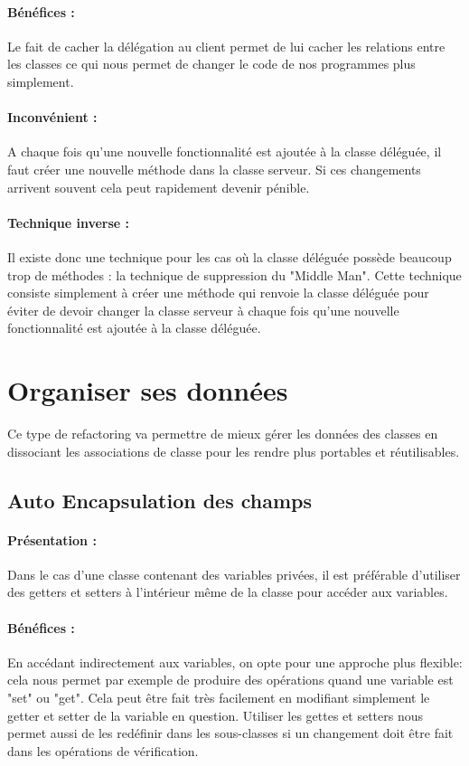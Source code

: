 \documentclass[a4paper,twoside,12pt,openright]{report}
\begin{document}
\paragraph{Bénéfices :}
Le fait de cacher la délégation au client permet de lui cacher les relations entre les classes ce qui nous permet de changer le code de nos programmes plus simplement.

\paragraph{Inconvénient :}
A chaque fois qu'une nouvelle fonctionnalité est ajoutée à la classe déléguée, il faut créer une nouvelle méthode dans la classe serveur. Si ces changements arrivent souvent cela peut rapidement devenir pénible.

\paragraph{Technique inverse :}
Il existe donc une technique pour les cas où la classe déléguée possède beaucoup trop de méthodes : la technique de suppression du "Middle Man".
Cette technique consiste simplement à créer une méthode qui renvoie la classe déléguée pour éviter de devoir changer la classe serveur à chaque fois qu'une nouvelle fonctionnalité est ajoutée à la classe déléguée.\\


\newpage
\section{Organiser ses données}
Ce type de refactoring va permettre de mieux gérer les données des classes en dissociant les associations de classe pour les rendre plus portables et réutilisables.\\


\subsection{Auto Encapsulation des champs}
\paragraph{Présentation :}
Dans le cas d'une classe contenant des variables privées, il est préférable d'utiliser des getters et setters à l'intérieur même de la classe pour accéder aux variables.

\paragraph{Bénéfices :}
En accédant indirectement aux variables, on opte pour une approche plus flexible: cela nous permet par exemple de produire des opérations quand une variable est "set" ou "get". Cela peut être fait très facilement en modifiant simplement le getter et setter de la variable en question.
Utiliser les gettes et setters nous permet aussi de les redéfinir dans les sous-classes si un changement doit être fait dans les opérations de vérification.\\
\end{document}
